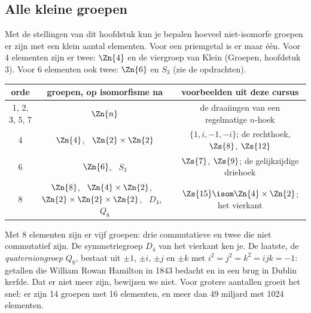 \begin{oefeningen}
\end{oefeningen}

\subsection{Alle kleine groepen}

Met de stellingen van dit hoofdstuk kun je bepalen hoeveel niet-isomorfe groepen er zijn met een klein aantal elementen. Voor een priemgetal is er maar één. Voor 4 elementen zijn er twee: $\Zn{4}$ en de viergroep van Klein (Groepen, hoofdstuk 3). Voor 6 elementen ook twee: $\Zn{6}$ en $S_3$ (zie de opdrachten).

\begin{center}
\renewcommand{\arraystretch}{1.3}
\begin{tabular}{|c|c|c|}
\hline
\rowcolor{accent!14} orde & groepen, op isomorfisme na & voorbeelden uit deze cursus \\ \hline
1, 2, 3, 5, 7 & $\Zn{n}$ & de draaiingen van een regelmatige $n$-hoek \\ \hline
4 & $\Zn{4}$, \ $\Zn{2} \times \Zn{2}$ & $\{1, i, -1, -i\}$; de rechthoek, $\Zs{8}$, $\Zs{12}$ \\ \hline
6 & $\Zn{6}$, \ $S_3$ & $\Zs{7}$, $\Zs{9}$; de gelijkzijdige driehoek \\ \hline
8 & $\Zn{8}$, \ $\Zn{4} \times \Zn{2}$, \ $\Zn{2} \times \Zn{2} \times \Zn{2}$, \ $D_4$, \ $Q_8$ & $\Zs{15} \isom \Zn{4} \times \Zn{2}$; het vierkant \\ \hline
\end{tabular}
\end{center}

Met 8 elementen zijn er vijf groepen: drie commutatieve en twee die niet commutatief zijn. De symmetriegroep $D_4$ van het vierkant ken je. De laatste, de \textit{quaterniongroep} $Q_8$, bestaat uit $\pm 1$, $\pm i$, $\pm j$ en $\pm k$ met $i^2 = j^2 = k^2 = ijk = -1$: getallen die William Rowan Hamilton in 1843 bedacht en in een brug in Dublin kerfde. Dat er niet meer zijn, bewijzen we niet. Voor grotere aantallen groeit het snel: er zijn 14 groepen met 16 elementen, en meer dan 49 miljard met 1024 elementen.

\opdrachtenkop


